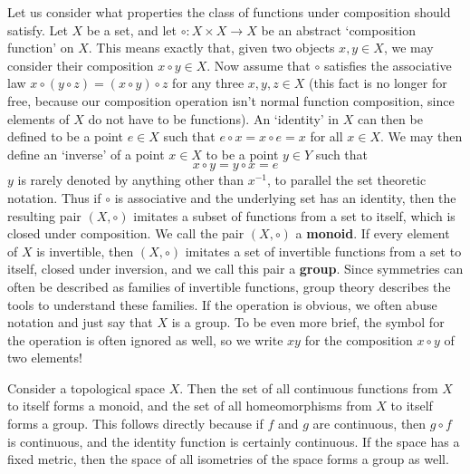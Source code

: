 Let us consider what properties the class of functions under composition should satisfy. Let $X$ be a set, and let $\circ: X \times X \to X$ be an abstract `composition function' on $X$. This means exactly that, given two objects $x,y \in X$, we may consider their composition $x \circ y \in X$. Now assume that $\circ$ satisfies the associative law $x \circ (y \circ z) = (x \circ y) \circ z$ for any three $x,y,z \in X$ (this fact is no longer for free, because our composition operation isn't normal function composition, since elements of $X$ do not have to be functions). An `identity' in $X$ can then be defined to be a point $e \in X$ such that $e \circ x = x \circ e = x$ for all $x \in X$. We may then define an `inverse' of a point $x \in X$ to be a point $y \in Y$ such that
%
\[ x \circ y = y \circ x = e \]
%
$y$ is rarely denoted by anything other than $x^{-1}$, to parallel the set theoretic notation. Thus if $\circ$ is associative and the underlying set has an identity, then the resulting pair $(X, \circ)$ imitates a subset of functions from a set to itself, which is closed under composition. We call the pair $(X, \circ)$ a {\bf monoid}. If every element of $X$ is invertible, then $(X, \circ)$ imitates a set of invertible functions from a set to itself, closed under inversion, and we call this pair a {\bf group}. Since symmetries can often be described as families of invertible functions, group theory describes the tools to understand these families. If the operation is obvious, we often abuse notation and just say that $X$ is a group. To be even more brief, the symbol for the operation is often ignored as well, so we write $xy$ for the composition $x \circ y$ of two elements!

\begin{example}
    Consider a topological space $X$. Then the set of all continuous functions from $X$ to itself forms a monoid, and the set of all homeomorphisms from $X$ to itself forms a group. This follows directly because if $f$ and $g$ are continuous, then $g \circ f$ is continuous, and the identity function is certainly continuous. If the space has a fixed metric, then the space of all isometries of the space forms a group as well.
\end{example}

